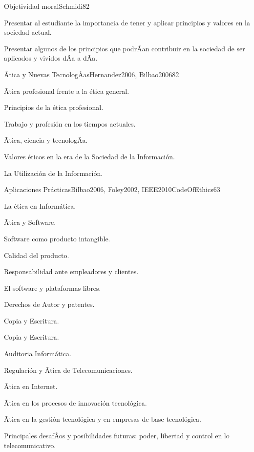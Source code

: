 \begin{syllabus}
\begin{unit}{Objetividad moral}{Schmidi}{8}{2}
\begin{unitgoals}
	\item Presentar al estudiante la importancia de tener y aplicar principios y valores en la sociedad actual.
	\item Presentar algunos de los principios que podrÃ­an contribuir en la sociedad de ser aplicados y vividos dÃ­a a dÃ­a.
\end{unitgoals}
\end{unit}

\begin{unit}{Ãtica y Nuevas TecnologÃ­as}{Hernandez2006, Bilbao2006}{8}{2}
\begin{topics}
      \item Ãtica profesional frente a la ética general.
      \item Principios de la ética profesional.
      \item Trabajo y profesión en los tiempos actuales.
      \item Ãtica, ciencia y tecnologÃ­a.
      \item Valores éticos en la era de la Sociedad de la Información.
      \item La Utilización de la Información.
\end{topics}
\end{unit}

\begin{unit}{Aplicaciones Prácticas}{Bilbao2006, Foley2002, IEEE2010CodeOfEthics}{6}{3}
\begin{topics}
      \item La ética en Informática.
      \item Ãtica y Software.
      \item Software como producto intangible.
      \item Calidad del producto.
      \item Responsabilidad ante empleadores y clientes.
      \item El software y plataformas libres.
      \item Derechos de Autor y patentes.
      \item Copia y Escritura.
      \item Copia y Escritura.
      \item Auditoria Informática.
      \item Regulación y Ãtica de Telecomunicaciones.
      \item Ãtica en Internet.
      \item Ãtica en los procesos de innovación tecnológica.
      \item Ãtica en la gestión tecnológica y en empresas de base tecnológica.
      \item Principales desafÃ­os y posibilidades futuras: poder, libertad y control en lo telecomunicativo.
\end{topics}
\end{unit}



\begin{coursebibliography}
\end{coursebibliography}

\end{syllabus}
